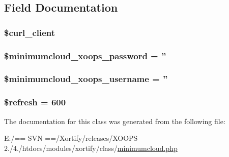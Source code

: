 \subsection{Field Documentation}
\hypertarget{class_minimumcloud_xortify_exchange_a402f2112991f3227835af80e9df33e38}{
\subsubsection[{\$curl\-\_\-client}]{\setlength{\rightskip}{0pt plus 5cm}\$curl\-\_\-client}}\label{class_minimumcloud_xortify_exchange_a402f2112991f3227835af80e9df33e38}
\hypertarget{class_minimumcloud_xortify_exchange_a8dfe74264e11f530e89e3527d432b4c1}{
\subsubsection[{\$minimumcloud\-\_\-xoops\-\_\-password}]{\setlength{\rightskip}{0pt plus 5cm}\$minimumcloud\-\_\-xoops\-\_\-password = ''}}\label{class_minimumcloud_xortify_exchange_a8dfe74264e11f530e89e3527d432b4c1}
\hypertarget{class_minimumcloud_xortify_exchange_a43e053bc7e50dc0203616ef89c3fb392}{
\subsubsection[{\$minimumcloud\-\_\-xoops\-\_\-username}]{\setlength{\rightskip}{0pt plus 5cm}\$minimumcloud\-\_\-xoops\-\_\-username = ''}}\label{class_minimumcloud_xortify_exchange_a43e053bc7e50dc0203616ef89c3fb392}
\hypertarget{class_minimumcloud_xortify_exchange_a8527f826b6959aaa92b0e51ee427ba1a}{
\subsubsection[{\$refresh}]{\setlength{\rightskip}{0pt plus 5cm}\$refresh = 600}}\label{class_minimumcloud_xortify_exchange_a8527f826b6959aaa92b0e51ee427ba1a}


The documentation for this class was generated from the following file\-:\begin{DoxyCompactItemize}
\item 
E\-:/== S\-V\-N ==/\-Xortify/releases/\-X\-O\-O\-P\-S 2./4./htdocs/modules/xortify/class/\hyperlink{minimumcloud_8php}{minimumcloud.\-php}\end{DoxyCompactItemize}
